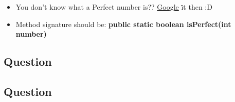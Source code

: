 \documentclass[12pt , a4paper]{article}
\newcommand{\google}{\href{https://www.google.com/}{\color{google_logo_color_blue}G\color{google_logo_color_red}o\color{google_logo_color_yellow}o\color{google_logo_color_blue}g\color{google_logo_color_green}l\color{google_logo_color_red}e\color{black}} \. }
\begin{document}
	\begin{importantBox}

		\begin{itemize}
			\item You don't know what a Perfect number is?? \google it then :D\\
			\item Method signature should be: \textbf{public static boolean isPerfect(int number)}
		\end{itemize}
	\end{importantBox}
	\newpage
	\subsection{Question}


	\newpage
	\subsection{Question}
\end{document}
